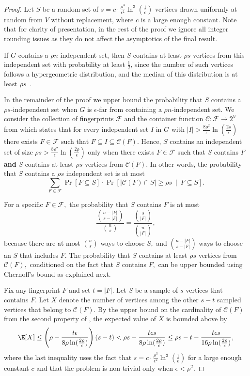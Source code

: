 \documentclass[11pt]{article}
\begin{document}
\begin{proof}
Let $S$ be a random set of $s = c \cdot \frac{\rho^3}{\epsilon^2} \ln^3\left(\frac 1\epsilon \right)$ vertices drawn uniformly at random from $V$ without replacement, where $c$ is a large enough constant.
Note that for clarity of presentation, in the rest of the proof we ignore all integer rounding issues as they do not affect the asymptotics of the final result.

If $G$ contains a $\rho n$ independent set, then $S$ contains at least $\rho s$ vertices from this independent set with probability at least $\frac12$, since the number of such vertices follows a hypergeometric distribution, and the median of this distribution is at least $\rho s$~\cite{Neumann70,KaasBurhman1980}.

In the remainder of the proof we upper bound the probability that $S$ contains a $\rho s$-independent set when $G$ is $\epsilon$-far from containing a $\rho n$-independent set.
We consider the collection of fingerprints $\mathcal{F}$ and the container function $\mathcal{C}: \mathcal{F} \rightarrow 2^V$ from  which states that for every independent set $I$ in $G$ with $|I| > \frac{8 \rho^2}{\epsilon}  \ln\left(\frac{2\rho}\epsilon\right)$ there exists $F \in \mathcal{F}$ such that $F \subseteq I \subseteq \mathcal{C}(F).$
Hence, $S$ contains an independent set of size $\rho s > \frac{8 \rho^2}{\epsilon}  \ln\left(\frac{2\rho}\epsilon\right)$ only when there exists $F \in \mathcal{F}$ such that $S$ contains $F$ \textbf{and} $S$ contains at least $\rho s$ vertices from $\mathcal{C}(F).$
In other words, the probability that $S$ contains a $\rho s$ independent set is at most
\[\sum_{F \in \mathcal{F}} \Pr[F \subseteq S] \cdot \Pr\left[\left|\mathcal{C}(F) \cap S\right| \geq \rho s ~\mid~ F \subseteq S\right].\]

For a specific $F \in \mathcal{F},$ the probability that $S$ contains $F$ is at most
\[\frac{\binom{n-|F|}{s-|F|}}{\binom{n}{s}} = \frac{\binom{s}{|F|}}{\binom{n}{|F|}},\]
because there are at most $\binom{n}{s}$ ways to choose $S,$ and $\binom{n-|F|}{s-|F|}$ ways to choose an $S$ that includes $F.$
The probability that $S$ contains at least $\rho s$ vertices from $\mathcal{C}(F),$ conditioned on the fact that $S$ contains $F,$ can be upper bounded using Chernoff's bound as explained next.

Fix any fingerprint $F$ and set $t = |F|$. 
Let $S$ be a sample of $s$ vertices that contains $F$.
Let $X$ denote the number of vertices among the other $s-t$ sampled vertices that belong to $\mathcal{C}(F)$. 
By the upper bound on the cardinality of $\mathcal{C}(F)$ from the second property of , the expected value of $X$ is bounded above by
\[
\E[X] \leq \left(\rho-\frac{t\epsilon}{8\rho\ln(\frac{2\rho}{\epsilon})}\right)(s-t) <  \rho s - \frac{t\epsilon s}{8\rho\ln(\frac{2\rho}{\epsilon})}
\le \rho s - t - \frac{t\epsilon s}{16 \rho\ln(\frac{2\rho}{\epsilon})},
\]
where the last inequality uses the fact that $s = c \cdot \frac{\rho^3}{\epsilon^2} \ln^3(\frac{1}{\epsilon})$ for a large enough constant $c$ and that the problem is non-trivial only when $\epsilon < \rho^2.$


\end{proof}
\end{document}

